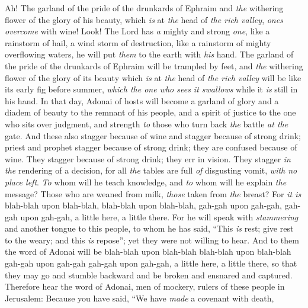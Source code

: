 \begin{biblechapter} %
 Ah! The garland of the pride of the drunkards of Ephraim 
and \textit{the} withering flower of the glory of his beauty, 
which \textit{is} at \textit{the} head of \textit{the rich valley}, 
\textit{ones overcome} with wine!
\verse Look! The Lord has \textit{a} mighty and strong \textit{one}, 
like a rainstorm of hail, a wind storm of destruction, 
like a rainstorm of mighty overflowing waters, 
he will put \textit{them} to the earth with \textit{his} hand.
\verse The garland of the pride of the drunkards of Ephraim 
will be trampled by feet,
\verse and \textit{the} withering flower of the glory of its beauty 
which \textit{is} at \textit{the} head of \textit{the rich valley} 
will be like its early fig before summer, 
\textit{which the one who sees it swallows} while it \textit{is} still in his hand.
\verse In that day, Adonai of hosts will become a garland of glory 
and a diadem of beauty to the remnant of his people,
\verse and a spirit of justice to the one who sits over judgment, 
and strength \textit{to} those who turn back \textit{the} battle \textit{at the} gate.
\verse And these also stagger because of wine 
and stagger because of strong drink; 
priest and prophet stagger because of strong drink; 
they are confused because of wine. 
They stagger because of strong drink; 
they err in vision. 
They stagger \textit{in the} rendering of a decision,
\verse for all \textit{the} tables are full \textit{of} disgusting vomit, \textit{with no place left}.
\verse \textit{To} whom will he teach knowledge, 
and \textit{to} whom will he explain \textit{the} message? 
Those who are weaned from milk, 
\textit{those} taken from \textit{the} breast?
\verse For \textit{it is} blah-blah upon blah-blah, 
blah-blah upon blah-blah, 
gah-gah upon gah-gah, 
gah-gah upon gah-gah, 
a little here, a little there.
\verse For he will speak with \textit{stammering} and another tongue to this people,
\verse to whom he has said, “This \textit{is} rest; give rest to the weary; 
and this \textit{is} repose”; yet they were not willing to hear.
\verse And to them the word of Adonai will be blah-blah upon blah-blah 
blah-blah upon blah-blah 
gah-gah upon gah-gah 
gah-gah upon gah-gah, 
a little here, a little there, 
so that they may go and stumble backward 
and be broken and ensnared and captured.
 Therefore hear the word of Adonai, men of mockery, 
rulers of these people in Jerusalem:
\verse Because you have said, “We have \textit{made} a covenant with death, 

\end{biblechapter}
